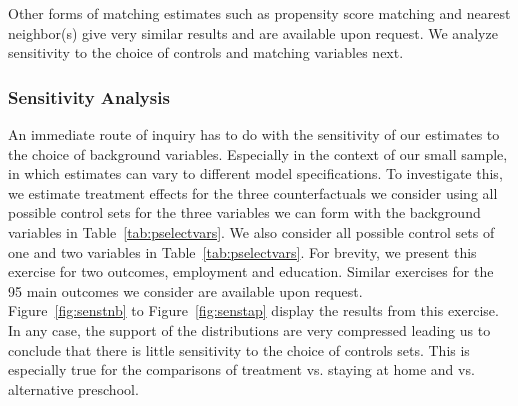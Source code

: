 \noindent Other forms of matching estimates such as propensity score matching and nearest neighbor(s) give very similar results and are available upon request. We analyze sensitivity to the choice of controls and matching variables next.\\

\subsubsection{Sensitivity Analysis} \label{app:senscontrols}

\noindent An immediate route of inquiry has to do with the sensitivity of our estimates to the choice of background variables. Especially in the context of our small sample, in which estimates can vary to different model specifications. To investigate this, we estimate treatment effects for the three counterfactuals we consider using all possible control sets for the three variables we can form with the background variables in Table~\ref{tab:pselectvars}. We also consider all possible control sets of one and two variables in Table~\ref{tab:pselectvars}. For brevity, we present this exercise for two outcomes, employment and education. Similar exercises for the 95 main outcomes we consider are available upon request.\\

\noindent Figure~\ref{fig:senstnb} to Figure~\ref{fig:senstap} display the results from this exercise. In any case, the support of the distributions are very compressed leading us to conclude that there is little sensitivity to the choice of controls sets. This is especially true for the comparisons of treatment vs. staying at home and vs. alternative preschool.

